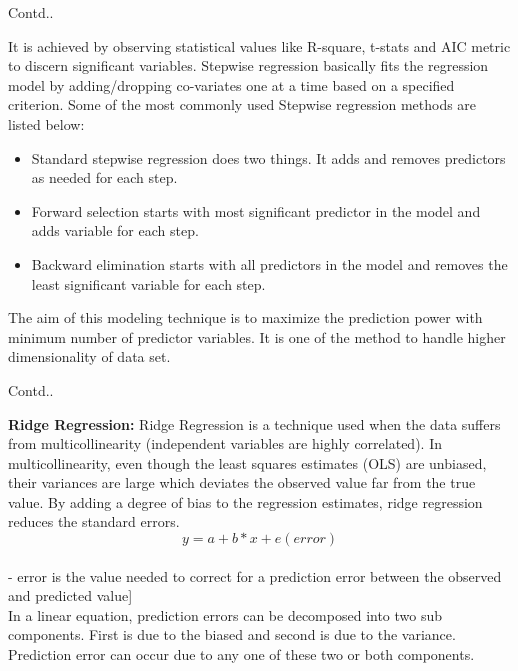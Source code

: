 \documentclass{beamer}
\begin{document}
\begin{frame}{Contd..}
	\begin{flushleft}
	It is achieved by observing statistical values like R-square, t-stats and AIC metric to discern significant variables. Stepwise regression basically fits the regression model by adding/dropping co-variates one at a time based on a specified criterion. Some of the most commonly used Stepwise regression methods are listed below:
\begin{itemize}
\item Standard stepwise regression does two things. It adds and removes predictors as needed for each step.
\item Forward selection starts with most significant predictor in the model and adds variable for each step.
\item Backward elimination starts with all predictors in the model and removes the least significant variable for each step.
\end{itemize}
\vspace{10pt}
The aim of this modeling technique is to maximize the prediction power with minimum number of predictor variables. It is one of the method to handle higher dimensionality of data set.

	\end{flushleft}
\end{frame}

\begin{frame}{Contd..}
\begin{flushleft}
	\textbf{Ridge Regression:}
Ridge Regression is a technique used when the data suffers from multicollinearity (independent variables are highly correlated). In multicollinearity, even though the least squares estimates (OLS) are unbiased, their variances are large which deviates the observed value far from the true value. By adding a degree of bias to the regression estimates, ridge regression reduces the standard errors.
\\
\vspace{10pt}
\begin{equation*}
	y=a+b*x+e (error)
\end{equation*}
\\
\vspace{10pt}
- error is the value needed to correct for a prediction error between the observed and predicted value]
\\
\vspace{10pt}
	In a linear equation, prediction errors can be decomposed into two sub components. First is due to the biased and second is due to the variance. Prediction error can occur due to any one of these two or both components.
\end{flushleft}
\end{frame}
\end{document}
